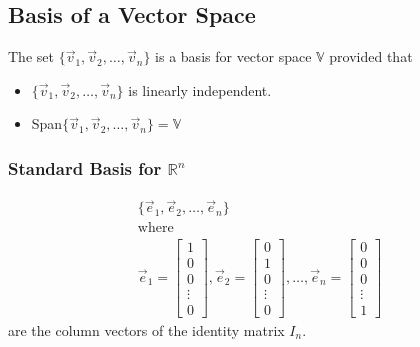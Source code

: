     \subsection{Basis of a Vector Space}
    The set $\{\vec{v}_1, \vec{v}_2, \ldots, \vec{v}_n\}$ is a basis for vector space $\mathbb{V}$ provided that

    \begin{itemize}
        \item $\{\vec{v}_1, \vec{v}_2, \ldots, \vec{v}_n\}$ is linearly independent.
        \item Span$\{\vec{v}_1, \vec{v}_2, \ldots, \vec{v}_n\} = \mathbb{V}$
    \end{itemize}

        \subsubsection{Standard Basis for $\mathbb{R}^n$}
        \begin{equation}\label{eq:basis_for_rn}
        \begin{aligned}
            \{\vec{e}_1, \vec{e}_2, \ldots, \vec{e}_n\}\\
            \text{where}\\
            \vec{e}_1 = \left[ \begin{array}{c}
                1\\
                0\\
                0\\
                \vdots\\
                0
            \end{array}\right],
            \vec{e}_2 = \left[ \begin{array}{c}
                0\\
                1\\
                0\\
                \vdots\\
                0
            \end{array}\right], \ldots,
            \vec{e}_n = \left[ \begin{array}{c}
                0\\
                0\\
                0\\
                \vdots\\
                1
            \end{array}\right]
        \end{aligned}
        \end{equation}
        are the column vectors of the identity matrix $I_n$.

